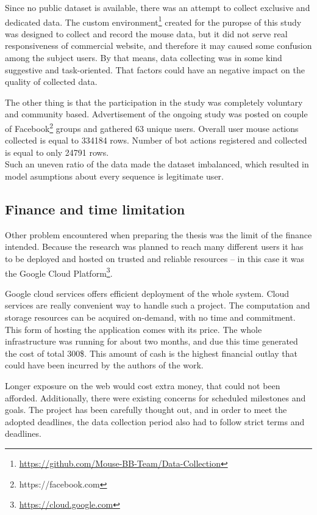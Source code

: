 Since no public dataset is available, there was an attempt to collect exclusive and dedicated data.
The custom environment\footnote{\url{https://github.com/Mouse-BB-Team/Data-Collection}} created for the puropse of this study was designed to collect and record the mouse data, but it did not serve real responsiveness of commercial website, and therefore it may caused some confusion among the subject users. By that means, data collecting was in some kind suggestive and task-oriented. That factors could have an negative impact on the quality of collected data.

The other thing is that the participation in the study was completely voluntary and community based.
Advertisement of the ongoing study was posted on couple of Facebook\footnote{https://facebook.com} groups and gathered \num{63} unique users. Overall user mouse actions collected is equal to \num{334184} rows.
Number of bot actions registered and collected is equal to only \num{24791} rows.\\
Such an uneven ratio of the data made the dataset imbalanced, which resulted in model asumptions about every sequence is legitimate user.

\subsection{Finance and time limitation}
Other problem encountered when preparing the thesis was the limit of the finance intended. Because the research was planned to reach many different users it has to be deployed and hosted on trusted and reliable resources – in this case it was the Google Cloud Platform\footnote{\url{https://cloud.google.com}}.

Google cloud services offers efficient deployment of the whole system.
Cloud services are really convenient way to handle such a project.
The computation and storage resources can be acquired on-demand, with no time and commitment. This form of hosting the application comes with its price.
The whole infrastructure was running for about two months, and due this time generated the cost of total \num{300}\$.
This amount of cash is the highest financial outlay that could have been incurred by the authors of the work.

Longer exposure on the web would cost extra money, that could not been afforded. Additionally, there were existing concerns for scheduled milestones and goals. The project has been carefully thought out, and in order to meet the adopted deadlines, the data collection period also had to follow strict terms and deadlines.

